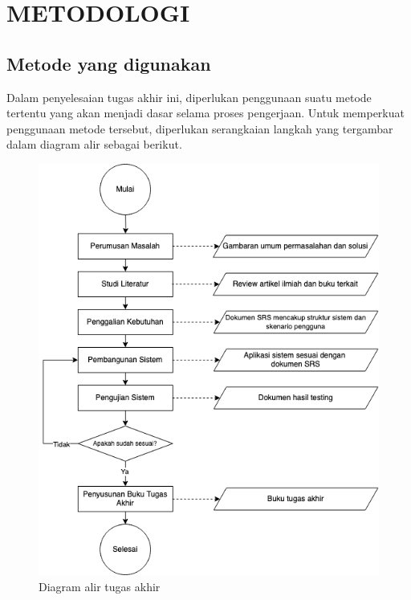 \chapter{METODOLOGI}


\section{Metode yang digunakan}

Dalam penyelesaian tugas akhir ini, diperlukan penggunaan suatu metode tertentu yang akan menjadi dasar selama proses pengerjaan. Untuk memperkuat penggunaan metode tersebut, diperlukan serangkaian langkah yang tergambar dalam diagram alir sebagai berikut.

\begin{figure} [H] \centering
  \includegraphics[scale=0.5]{gambar/flow.png}
  \caption{Diagram alir tugas akhir}
  \label{fig:Flow}
\end{figure}

